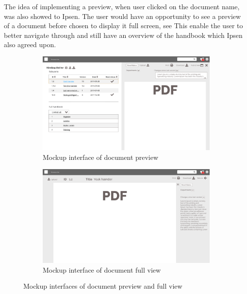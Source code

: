 The idea of implementing a preview, when user clicked on the document name, was also showed to Ipsen.
The user would have an opportunity to see a preview of a document before chosen to display it full screen, see 
This enable the user to better navigate through and still have an overview of the handbook which Ipsen also agreed upon.

\begin{figure}[H]
	\centering
	\begin{subfigure}[b]{0.48\textwidth}
		\includegraphics[width=\textwidth]{billeder/PreviewVersion.jpg}
		\caption{Mockup interface of document preview}
	\end{subfigure}
	\quad
	\begin{subfigure}[b]{0.48\textwidth}
		\includegraphics[width=\textwidth]{billeder/FullView.jpg}
		\caption{Mockup interface of document full view}
	\end{subfigure}
	\caption{Mockup interfaces of document preview and full view}\label{fig:mockupPreview}
\end{figure}

